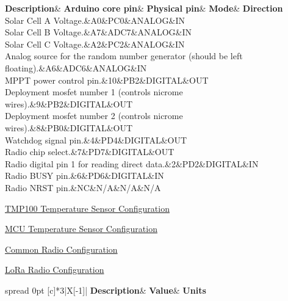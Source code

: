 \begin{DoxyCompactItemize}
\begin{DoxyCompactList}
\begin{longtabu}
\endfirsthead
\hline
\endfoot
\hline
\rowcolor{\tableheadbgcolor}\textbf{ Description}&\textbf{ Arduino core pin}&\textbf{ Physical pin}&\textbf{ Mode}&\textbf{ Direction  }\\
\endhead
Solar Cell A Voltage.&A0&P\+C0&A\+N\+A\+L\+OG&IN \\
Solar Cell B Voltage.&A7&A\+D\+C7&A\+N\+A\+L\+OG&IN \\
Solar Cell C Voltage.&A2&P\+C2&A\+N\+A\+L\+OG&IN \\
Analog source for the random number generator (should be left floating).&A6&A\+D\+C6&A\+N\+A\+L\+OG&IN \\
M\+P\+PT power control pin.&10&P\+B2&D\+I\+G\+I\+T\+AL&O\+UT \\
Deployment mosfet number 1 (controls nicrome wires).&9&P\+B2&D\+I\+G\+I\+T\+AL&O\+UT \\
Deployment mosfet number 2 (controls nicrome wires).&8&P\+B0&D\+I\+G\+I\+T\+AL&O\+UT \\
Watchdog signal pin.&4&P\+D4&D\+I\+G\+I\+T\+AL&O\+UT \\
Radio chip select.&7&P\+D7&D\+I\+G\+I\+T\+AL&O\+UT \\
Radio digital pin 1 for reading direct data.&2&P\+D2&D\+I\+G\+I\+T\+AL&IN \\
Radio B\+U\+SY pin.&6&P\+D6&D\+I\+G\+I\+T\+AL&IN \\
Radio N\+R\+ST pin.&NC&N/A&N/A&N/A \\
\end{longtabu}
\end{DoxyCompactList}\item 
\hyperlink{group__defines__tmp100__configuration}{T\+M\+P100 Temperature Sensor Configuration}
\item 
\hyperlink{group__defines__mcu__temperature__configuration}{M\+C\+U Temperature Sensor Configuration}
\item 
\hyperlink{group__defines__radio__common__configuraiton}{Common Radio Configuration}
\item 
\hyperlink{group__defines__radio__lora__configuration}{Lo\+Ra Radio Configuration}
\begin{DoxyCompactList}\small\item\em \tabulinesep=1mm
\begin{longtabu} spread 0pt [c]{*{3}{|X[-1]}|}
\hline
\rowcolor{\tableheadbgcolor}\textbf{ Description}&\textbf{ Value}&\textbf{ Units  }\\

\end{longtabu}
\end{DoxyCompactList}
\end{DoxyCompactItemize}
